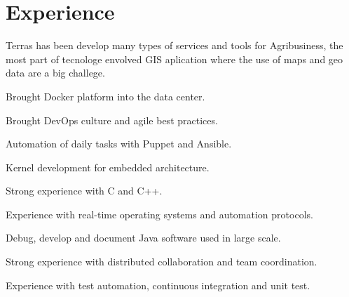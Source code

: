 \documentclass[]{joaosoares-resume}
\begin{document}
\begin{minipage}[t]{0.64\textwidth}

\section{Experience}
\sectionsep
Terras has been develop many types of services and tools for Agribusiness, the most part 
of tecnologe envolved GIS aplication where the use of maps and geo data are a big challege.
\sectionsep
\begin{tightemize}
\item Brought Docker platform into the data center.
\item Brought DevOps culture and agile best practices.
\item Automation of daily tasks with Puppet and Ansible.
\end{tightemize}
\sectionsep

\begin{tightemize}
\item Kernel development for embedded architecture.
\item Strong experience with C and C++.
\item Experience with real-time operating systems and automation protocols.
\end{tightemize}
\sectionsep

\begin{tightemize}
\item Debug, develop and document Java software used in large scale.
\item Strong experience with distributed collaboration and team coordination.
\item Experience with test automation, continuous integration and unit test.
\end{tightemize}
\sectionsep


\end{minipage}
\end{document}
